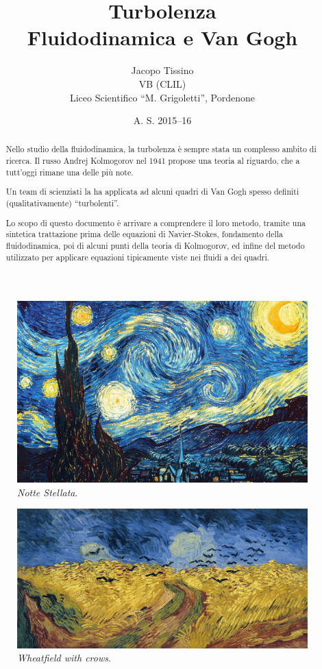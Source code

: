 \documentclass[12pt,a4paper]{article}
\author{Jacopo Tissino \\
VB
(CLIL)\\
Liceo Scientifico ``M. Grigoletti'', Pordenone}
\date{A. S. 2015--16}
\title{\huge{\textbf{Turbolenza}}\\
\Large{Fluidodinamica e Van Gogh}}
\numberwithin{equation}{section}
\begin{document}
\maketitle

\begin{abstract}
Nello studio della fluidodinamica, la turbolenza è sempre stata un complesso ambito di ricerca. Il russo Andrej Kolmogorov nel 1941 propose una teoria al riguardo, che a tutt'oggi rimane una delle più note.

Un team di scienziati \cite{study2006} la ha applicata ad alcuni quadri di Van Gogh spesso definiti (qualitativamente) ``turbolenti''.

Lo scopo di questo documento è arrivare a comprendere il loro metodo, tramite una sintetica trattazione prima delle equazioni di Navier-Stokes, fondamento della fluidodinamica, poi di alcuni punti della teoria di Kolmogorov, ed infine del metodo utilizzato per applicare equazioni tipicamente viste nei fluidi a dei quadri.
\end{abstract}

\begin{figure}[h]
    \centering
    \includegraphics[scale=0.15]{the-starry-night-1889.jpg}
    \caption{\emph{Notte Stellata}.}
    \label{starrynight}
\end{figure}

\begin{figure}
    \centering
    \includegraphics[scale=0.12]{wheatfield.jpg}
    \caption{\emph{Wheatfield with crows}.}
    \label{wheatfield}
\end{figure}
\end{document}
